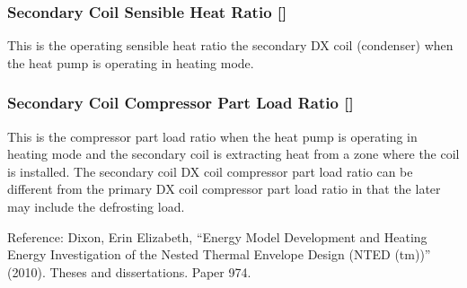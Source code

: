\subsubsection{\texorpdfstring{Secondary Coil Sensible Heat Ratio {[]}}{Secondary Coil Sensible Heat Ratio }}\label{secondary-coil-sensible-heat-ratio}

This is the operating sensible heat ratio the secondary DX coil (condenser) when the heat pump is operating in heating mode.

\subsubsection{\texorpdfstring{Secondary Coil Compressor Part Load Ratio {[]}}{Secondary Coil Compressor Part Load Ratio }}\label{secondary-coil-compressor-part-load-ratio}

This is the compressor part load ratio when the heat pump is operating in heating mode and the secondary coil is extracting heat from a zone where the coil is installed. The secondary coil DX coil compressor part load ratio can be different from the primary DX coil compressor part load ratio in that the later may include the defrosting load.

Reference: Dixon, Erin Elizabeth, ``Energy Model Development and Heating Energy Investigation of the Nested Thermal Envelope Design (NTED (tm))'' (2010). Theses and dissertations. Paper 974.
